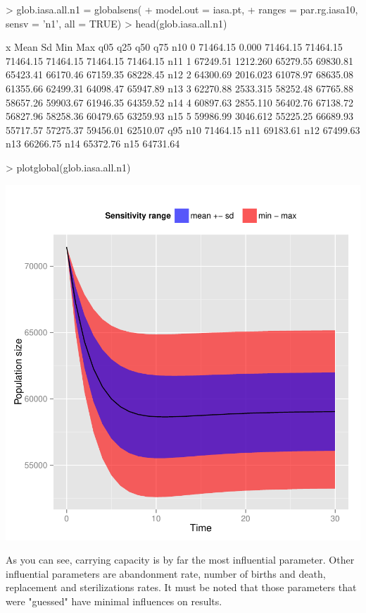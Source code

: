 \documentclass[a4paper]{article}
\begin{document}
\begin{Schunk}
\begin{Sinput}
> glob.iasa.all.n1 = globalsens(
+   model.out = iasa.pt,
+   ranges = par.rg.iasa10, sensv = 'n1', all = TRUE)
> head(glob.iasa.all.n1)
\end{Sinput}
\begin{Soutput}
    x     Mean       Sd      Min      Max      q05      q25      q50      q75
n10 0 71464.15    0.000 71464.15 71464.15 71464.15 71464.15 71464.15 71464.15
n11 1 67249.51 1212.260 65279.55 69830.81 65423.41 66170.46 67159.35 68228.45
n12 2 64300.69 2016.023 61078.97 68635.08 61355.66 62499.31 64098.47 65947.89
n13 3 62270.88 2533.315 58252.48 67765.88 58657.26 59903.67 61946.35 64359.52
n14 4 60897.63 2855.110 56402.76 67138.72 56827.96 58258.36 60479.65 63259.93
n15 5 59986.99 3046.612 55225.25 66689.93 55717.57 57275.37 59456.01 62510.07
         q95
n10 71464.15
n11 69183.61
n12 67499.63
n13 66266.75
n14 65372.76
n15 64731.64
\end{Soutput}
\begin{Sinput}
> plotglobal(glob.iasa.all.n1)
\end{Sinput}
\end{Schunk}
\begin{center}
\includegraphics{capm_example-035}
\end{center}
As you can see, carrying capacity is by far the most influential parameter. Other influential parameters are abandonment rate, number of births and death, replacement and sterilizations rates. It must be noted that those parameters that were "guessed" have minimal influences on results.
\end{document}
